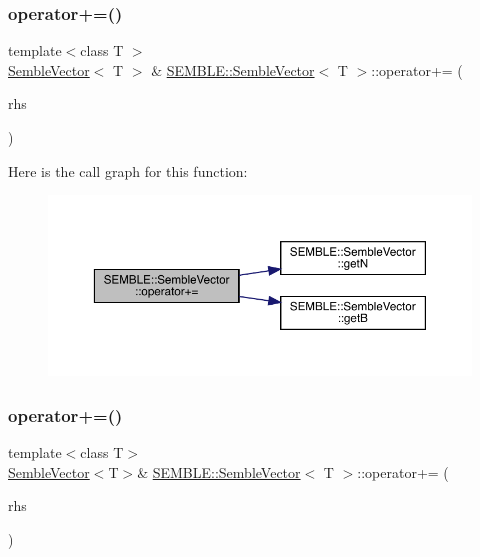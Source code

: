 \mbox{\label{structSEMBLE_1_1SembleVector_a98e60b3ac2d9966ac626257fdaf02e68}} 
\subsubsection{\texorpdfstring{operator+=()}{operator+=()}\hspace{0.1cm}{\footnotesize\ttfamily [1/4]}}
{\footnotesize\ttfamily template$<$class T $>$ \\
\mbox{\hyperlink{structSEMBLE_1_1SembleVector}{Semble\+Vector}}$<$ T $>$ \& \mbox{\hyperlink{structSEMBLE_1_1SembleVector}{S\+E\+M\+B\+L\+E\+::\+Semble\+Vector}}$<$ T $>$\+::operator+= (\begin{DoxyParamCaption}\item[{const \mbox{\hyperlink{structSEMBLE_1_1SembleVector}{Semble\+Vector}}$<$ T $>$ \&}]{rhs }\end{DoxyParamCaption})}

Here is the call graph for this function\+:
\nopagebreak
\begin{figure}[H]
\begin{center}
\leavevmode
\includegraphics[width=350pt]{d9/d94/structSEMBLE_1_1SembleVector_a98e60b3ac2d9966ac626257fdaf02e68_cgraph}
\end{center}
\end{figure}
\mbox{\label{structSEMBLE_1_1SembleVector_ac40d91d7822b52c779763c6812f53a56}} 
\subsubsection{\texorpdfstring{operator+=()}{operator+=()}\hspace{0.1cm}{\footnotesize\ttfamily [2/4]}}
{\footnotesize\ttfamily template$<$class T$>$ \\
\mbox{\hyperlink{structSEMBLE_1_1SembleVector}{Semble\+Vector}}$<$T$>$\& \mbox{\hyperlink{structSEMBLE_1_1SembleVector}{S\+E\+M\+B\+L\+E\+::\+Semble\+Vector}}$<$ T $>$\+::operator+= (\begin{DoxyParamCaption}\item[{const \mbox{\hyperlink{structSEMBLE_1_1SembleVector}{Semble\+Vector}}$<$ T $>$ \&}]{rhs }\end{DoxyParamCaption})}

